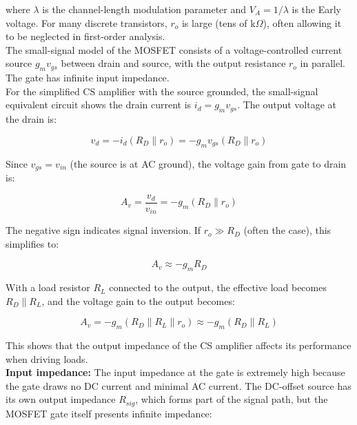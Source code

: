 \documentclass[10pt]{article}
\begin{document}
where $\lambda$ is the channel-length modulation parameter and $V_A = 1/\lambda$ is the Early voltage.  For many discrete transistors, $r_o$ is large (tens of k$\Omega$), often allowing it to be neglected in first-order analysis. \\

The small-signal model of the MOSFET consists of a voltage-controlled current source $g_m v_{gs}$ between drain and source, with the output resistance $r_o$ in parallel.  The gate has infinite input impedance. \\

For the simplified CS amplifier with the source grounded, the small-signal equivalent circuit shows the drain current is $i_d = g_m v_{gs}$. The output voltage at the drain is:

\begin{equation}
    v_d = -i_d (R_D \parallel r_o) = -g_m v_{gs} (R_D \parallel r_o)
    \label{eq:vd_ss}
\end{equation}

Since $v_{gs} = v_{in}$ (the source is at AC ground), the voltage gain from gate to drain is:

\begin{equation}
    A_v = \frac{v_d}{v_{in}} = -g_m (R_D \parallel r_o)
    \label{eq:av_cs}
\end{equation}

The negative sign indicates signal inversion.  If $r_o \gg R_D$ (often the case), this simplifies to:

\begin{equation}
    A_v \approx -g_m R_D
    \label{eq:av_cs_simple}
\end{equation}

With a load resistor $R_L$ connected to the output, the effective load becomes $R_D \parallel R_L$, and the voltage gain to the output becomes:

\begin{equation}
    A_v = -g_m (R_D \parallel R_L \parallel r_o) \approx -g_m (R_D \parallel R_L)
    \label{eq:av_cs_loaded}
\end{equation}

This shows that the output impedance of the CS amplifier affects its performance when driving loads. \\

\textbf{Input impedance:} The input impedance at the gate is extremely high because the gate draws no DC current and minimal AC current. The DC-offset source has its own output impedance $R_{sig}$, which forms part of the signal path, but the MOSFET gate itself presents infinite impedance:
\end{document}

